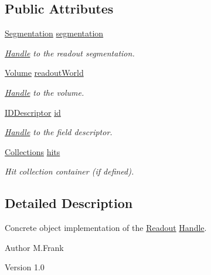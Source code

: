 \subsection*{Public Attributes}
\begin{DoxyCompactItemize}
\item 
\hyperlink{class_d_d4hep_1_1_geometry_1_1_segmentation}{Segmentation} \hyperlink{class_d_d4hep_1_1_geometry_1_1_readout_object_ac9e7bca00d99bd317bdd942c9ab132d5}{segmentation}
\begin{DoxyCompactList}\small\item\em \hyperlink{class_d_d4hep_1_1_handle}{Handle} to the readout segmentation. \item\end{DoxyCompactList}\item 
\hyperlink{class_d_d4hep_1_1_geometry_1_1_volume}{Volume} \hyperlink{class_d_d4hep_1_1_geometry_1_1_readout_object_ac4b6fc2857d2794caa59a544de8b2579}{readoutWorld}
\begin{DoxyCompactList}\small\item\em \hyperlink{class_d_d4hep_1_1_handle}{Handle} to the volume. \item\end{DoxyCompactList}\item 
\hyperlink{class_d_d4hep_1_1_geometry_1_1_i_d_descriptor}{IDDescriptor} \hyperlink{class_d_d4hep_1_1_geometry_1_1_readout_object_a46cd564f02d0c5c82382fe75f6bae2eb}{id}
\begin{DoxyCompactList}\small\item\em \hyperlink{class_d_d4hep_1_1_handle}{Handle} to the field descriptor. \item\end{DoxyCompactList}\item 
\hyperlink{class_d_d4hep_1_1_geometry_1_1_readout_object_a1093be792a71654cf6116686b0ab7cb6}{Collections} \hyperlink{class_d_d4hep_1_1_geometry_1_1_readout_object_a07fe52ab89e2b0806f68da5eea1d8899}{hits}
\begin{DoxyCompactList}\small\item\em Hit collection container (if defined). \item\end{DoxyCompactList}\end{DoxyCompactItemize}


\subsection{Detailed Description}
Concrete object implementation of the \hyperlink{class_d_d4hep_1_1_geometry_1_1_readout}{Readout} \hyperlink{class_d_d4hep_1_1_handle}{Handle}. \begin{DoxyAuthor}{Author}
M.Frank 
\end{DoxyAuthor}
\begin{DoxyVersion}{Version}
1.0 
\end{DoxyVersion}


